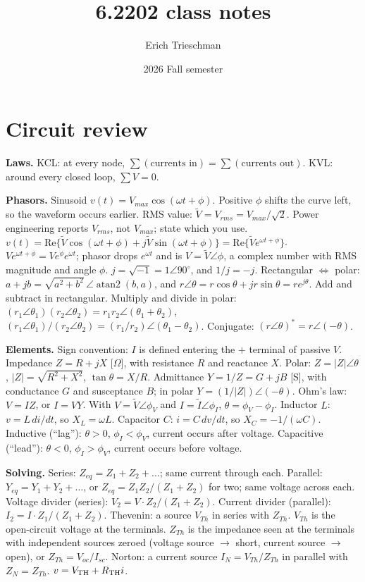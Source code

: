 \documentclass{article}
\title{6.2202 class notes}
\author{Erich Trieschman}
\date{2026 Fall semester}
\newcommand{\abs}[1]{\lvert#1\rvert}
\begin{document}
\maketitle
\tableofcontents

\section{Circuit review}
\textbf{Laws.}
KCL: at every node, $\sum(\text{currents in}) = \sum(\text{currents out})$.
KVL: around every closed loop, $\sum V = 0$.

\textbf{Phasors.}
Sinusoid $v(t) = V_{max}\cos(\omega t + \phi)$.
Positive $\phi$ shifts the curve left, so the waveform occurs earlier.
RMS value: $\tilde V = V_{rms} = V_{max}/\sqrt2$.
Power engineering reports $V_{rms}$, not $V_{max}$; state which you use.
$v(t) = \text{Re}\{\tilde V\cos(\omega t + \phi) + j\tilde V\sin(\omega t + \phi)\} = \text{Re}\{\tilde Ve^{\omega t + \phi}\}$. 
$Ve^{\omega t + \phi} = Ve^\phi e^{\omega t}$; phasor drops $e^{\omega t}$ and is $V = \tilde V\angle\phi$, a complex number with RMS magnitude and angle $\phi$.
$j = \sqrt{-1} = 1\angle90^\circ$, and $1/j = -j$.
Rectangular $\iff$ polar: $a + jb = \sqrt{a^2 + b^2}\,\angle\operatorname{atan2}(b,a)$, and $r\angle\theta = r\cos\theta + jr\sin\theta = re^{j\theta}$.
Add and subtract in rectangular.
Multiply and divide in polar: $(r_1\angle\theta_1)(r_2\angle\theta_2) = r_1 r_2\angle(\theta_1 + \theta_2)$, $(r_1\angle\theta_1)/(r_2\angle\theta_2) = (r_1/r_2)\angle(\theta_1 - \theta_2)$.
Conjugate: $(r\angle\theta)^* = r\angle(-\theta)$.

\textbf{Elements.}
Sign convention: $I$ is defined entering the $+$ terminal of passive $V$.
Impedance $Z = R + jX$ [$\Omega$], with resistance $R$ and reactance $X$.
Polar: $Z = \abs Z\angle\theta$, $\abs Z = \sqrt{R^2 + X^2}$, $\tan\theta = X/R$.
Admittance $Y = 1/Z = G + jB$ [S], with conductance $G$ and susceptance $B$; in polar $Y = (1/\abs Z)\angle(-\theta)$.
Ohm's law: $V = IZ$, or $I = VY$.
With $V = \tilde V\angle\phi_V$ and $I = \tilde I\angle\phi_I$, $\theta = \phi_V - \phi_I$.
Inductor $L$: $v = L\,di/dt$, so $X_L = \omega L$.
Capacitor $C$: $i = C\,dv/dt$, so $X_C = -1/(\omega C)$.
Inductive (``lag''): $\theta > 0$, $\phi_I < \phi_V$, current occurs after voltage.
Capacitive (``lead''): $\theta < 0$, $\phi_I > \phi_V$, current occurs before voltage.

\textbf{Solving.}
Series: $Z_{eq} = Z_1 + Z_2 + \dots$; same current through each.
Parallel: $Y_{eq} = Y_1 + Y_2 + \dots$, or $Z_{eq} = Z_1 Z_2/(Z_1 + Z_2)$ for two; same voltage across each.
Voltage divider (series): $V_2 = V\cdot Z_2/(Z_1 + Z_2)$.
Current divider (parallel): $I_2 = I\cdot Z_1/(Z_1 + Z_2)$.
Thevenin: a source $V_{Th}$ in series with $Z_{Th}$.
$V_{Th}$ is the open-circuit voltage at the terminals.
$Z_{Th}$ is the impedance seen at the terminals with independent sources zeroed (voltage source $\to$ short, current source $\to$ open), or $Z_{Th} = V_{oc}/I_{sc}$.
Norton: a current source $I_N = V_{Th}/Z_{Th}$ in parallel with $Z_N = Z_{Th}$.
$v = V_{\rm TH} + R_{\rm TH}i$.
\end{document}
